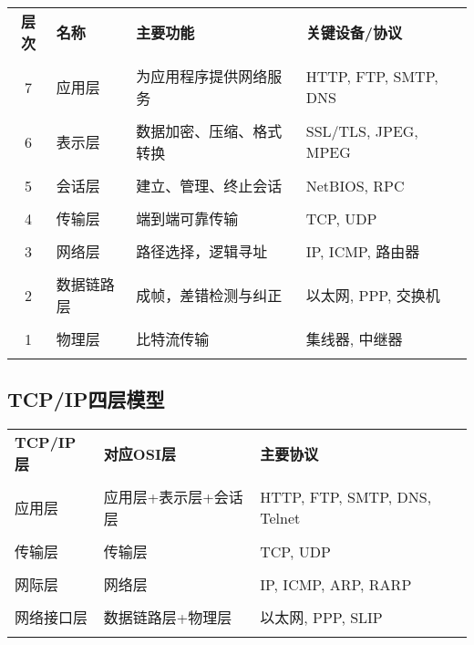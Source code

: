 \documentclass[lang=cn,newtx,10pt,scheme=chinese]{../../elegantbook}
\begin{document}
\begin{longtable}{@{}clp{4cm}p{5cm}@{}}
\toprule
\textbf{层次} & \textbf{名称} & \textbf{主要功能} & \textbf{关键设备/协议} \\\\ \midrule
\endhead

7 & 应用层 & 为应用程序提供网络服务 & HTTP, FTP, SMTP, DNS \\\\
6 & 表示层 & 数据加密、压缩、格式转换 & SSL/TLS, JPEG, MPEG \\\\
5 & 会话层 & 建立、管理、终止会话 & NetBIOS, RPC \\\\
4 & 传输层 & 端到端可靠传输 & TCP, UDP \\\\
3 & 网络层 & 路径选择，逻辑寻址 & IP, ICMP, 路由器 \\\\
2 & 数据链路层 & 成帧，差错检测与纠正 & 以太网, PPP, 交换机 \\\\
1 & 物理层 & 比特流传输 & 集线器, 中继器 \\\\

\bottomrule
\end{longtable}

\subsection{TCP/IP四层模型}

\begin{longtable}{@{}p{3cm}p{4cm}p{6cm}@{}}
\toprule
\textbf{TCP/IP层} & \textbf{对应OSI层} & \textbf{主要协议} \\\\ \midrule
\endhead

应用层 & 应用层+表示层+会话层 & HTTP, FTP, SMTP, DNS, Telnet \\\\
传输层 & 传输层 & TCP, UDP \\\\
网际层 & 网络层 & IP, ICMP, ARP, RARP \\\\
网络接口层 & 数据链路层+物理层 & 以太网, PPP, SLIP \\\\

\bottomrule
\end{longtable}
\end{document}
